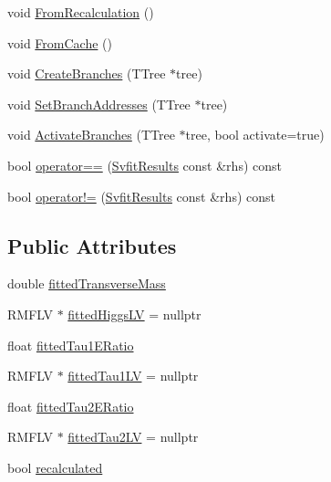 \begin{DoxyCompactItemize}
\item 
void \hyperlink{classSvfitResults_a57b084ba9986fcfe3709ae0f28c0d418}{FromRecalculation} ()
\item 
void \hyperlink{classSvfitResults_aa2dfd4bb75cdb81445d4a7f12ff13765}{FromCache} ()
\item 
void \hyperlink{classSvfitResults_ad4822dc697bd45db7b7aa76c00ebd8e1}{CreateBranches} (TTree $\ast$tree)
\item 
void \hyperlink{classSvfitResults_aa81f0fc890b1d57d6e780c195dc8a956}{SetBranchAddresses} (TTree $\ast$tree)
\item 
void \hyperlink{classSvfitResults_aa0a9d6018105c2c242239e66d0af4a51}{ActivateBranches} (TTree $\ast$tree, bool activate=true)
\item 
bool \hyperlink{classSvfitResults_a574ed1daf1dbdc964579142882be0a8c}{operator==} (\hyperlink{classSvfitResults}{SvfitResults} const \&rhs) const 
\item 
bool \hyperlink{classSvfitResults_ad041804809054ef7c2646c60917ba4df}{operator!=} (\hyperlink{classSvfitResults}{SvfitResults} const \&rhs) const 
\end{DoxyCompactItemize}
\subsection*{Public Attributes}
\begin{DoxyCompactItemize}
\item 
double \hyperlink{classSvfitResults_a0da3be281513b44ba678f0402b0bdf1d}{fittedTransverseMass}
\item 
RMFLV $\ast$ \hyperlink{classSvfitResults_ad53212bbbb3ed120e696fe36fa4ad215}{fittedHiggsLV} = nullptr
\item 
float \hyperlink{classSvfitResults_a061a9d939fb96f6cdfc0688a7b3db356}{fittedTau1ERatio}
\item 
RMFLV $\ast$ \hyperlink{classSvfitResults_a122d035561c86eff8aa24f84e0c67cb2}{fittedTau1LV} = nullptr
\item 
float \hyperlink{classSvfitResults_a94a0917e8fac0662ad460800b77aa71e}{fittedTau2ERatio}
\item 
RMFLV $\ast$ \hyperlink{classSvfitResults_ad1b5371d1ebf4c5cc04c029f280a46cb}{fittedTau2LV} = nullptr
\item 
bool \hyperlink{classSvfitResults_ad5d54373ccfdfb31d2a2c6006cd7c472}{recalculated}
\end{DoxyCompactItemize}


